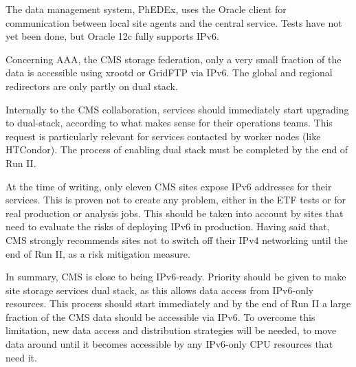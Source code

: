 \documentclass[11pt]{article}
\begin{document}
The data management system, PhEDEx, uses the Oracle client for communication between local site agents and the central service. Tests
have not yet been done, but Oracle 12c fully supports IPv6.

Concerning AAA, the CMS storage federation, only a very small fraction of the data is accessible using xrootd or GridFTP via IPv6. The global and regional redirectors are only partly on dual stack.

Internally to the CMS collaboration, services should immediately start upgrading to dual-stack, according to what makes sense for their operations teams. This request is particularly relevant for services contacted by worker nodes (like HTCondor). The process of enabling dual stack must be completed by the end of Run II.

At the time of writing, only eleven CMS sites expose IPv6 addresses for their services. This is proven not to create any problem, either in the ETF tests or for real production or analysis jobs. This should be taken into account by sites that need to evaluate the risks of deploying IPv6 in production.  Having said that, CMS strongly recommends sites not to switch off their IPv4 networking until the end of Run II, as a risk mitigation measure.




In summary, CMS is close to being IPv6-ready. Priority should be given to make site storage services dual stack, as this allows data access from IPv6-only resources. This process should start immediately and by the end of Run II a large fraction of the CMS data should be accessible via IPv6.  To overcome this limitation, new data access and distribution strategies will be needed, to move data around until it becomes accessible by any IPv6-only CPU resources that need it.
\end{document}
